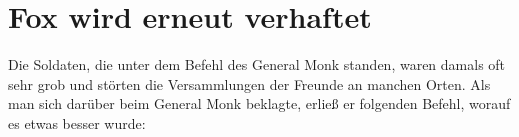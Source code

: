 \section{Fox wird erneut verhaftet}

Die Soldaten, die unter dem Befehl des General 
Monk standen, waren damals oft sehr grob 
und störten die Versammlungen 
der Freunde an manchen Orten. Als man sich darüber
beim General Monk beklagte, erließ er folgenden Befehl, worauf
es etwas besser wurde:




